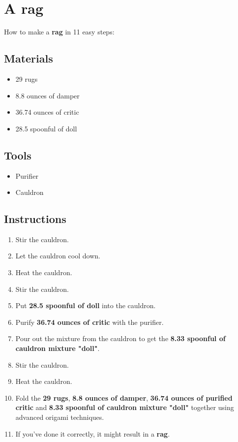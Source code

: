 \documentclass{article}
\begin{document}
\section{A rag}How to make a \textbf{rag} in 11 easy steps:

\subsection{Materials}\begin{itemize}
\item 
29 rugs
\item 
8.8 ounces of damper
\item 
36.74 ounces of critic
\item 
28.5 spoonful of doll
\end{itemize}
\subsection{Tools}\begin{itemize}
\item 
Purifier
\item 
Cauldron
\end{itemize}
\subsection{Instructions}\begin{enumerate}
\item 
Stir the cauldron.
\item 
Let the cauldron cool down.
\item 
Heat the cauldron.
\item 
Stir the cauldron.
\item 
Put \textbf{28.5 spoonful of doll} into the cauldron.
\item 
Purify \textbf{36.74 ounces of critic} with the purifier.
\item 
Pour out the mixture from the cauldron to get the \textbf{8.33 spoonful of cauldron mixture "doll"}.
\item 
Stir the cauldron.
\item 
Heat the cauldron.
\item 
Fold the \textbf{29 rugs}, \textbf{8.8 ounces of damper}, \textbf{36.74 ounces of purified critic} and \textbf{8.33 spoonful of cauldron mixture "doll"} together using advanced origami techniques.
\item 
If you've done it correctly, it might result in a \textbf{rag}.
\end{enumerate}
\newpage
\end{document}
